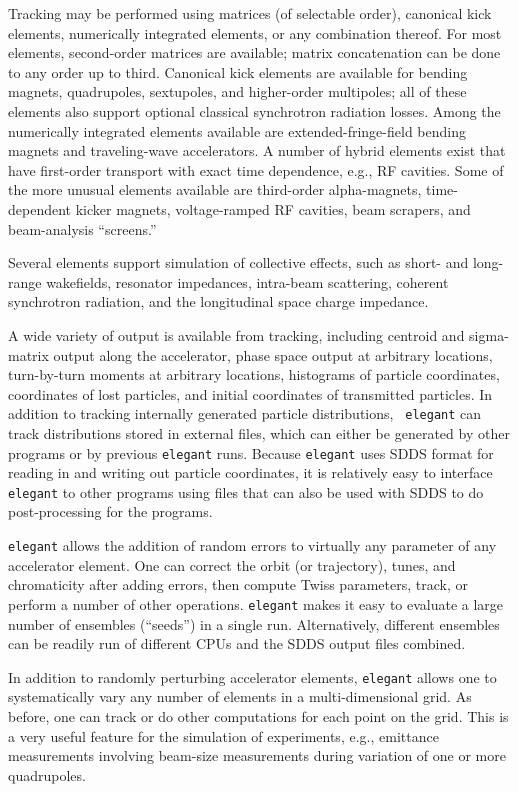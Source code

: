 \documentclass[11pt]{article}
\begin{document}
Tracking may be performed using matrices (of selectable order),
canonical kick elements, numerically integrated elements, or any
combination thereof.  For most elements, second-order matrices are
available; matrix concatenation can be done to any order up to third.
Canonical kick elements are available for bending magnets,
quadrupoles, sextupoles, and higher-order multipoles; all of these
elements also support optional classical synchrotron radiation losses.
Among the numerically integrated elements available are
extended-fringe-field bending magnets and traveling-wave accelerators.
A number of hybrid elements exist that have first-order transport with
exact time dependence, e.g., RF cavities.    Some of the more unusual
elements available are third-order
alpha-magnets\cite{Enge,Borland_thesis}, time-dependent kicker
magnets, voltage-ramped RF cavities, beam scrapers, and beam-analysis
``screens.''

Several elements support simulation of collective effects, such as
short- and long-range wakefields, resonator impedances, intra-beam scattering,
coherent synchrotron radiation, and the longitudinal space charge
impedance. 

A wide variety of output is available from tracking, including
centroid and sigma-matrix output along the accelerator, phase space
output at arbitrary locations, turn-by-turn moments at arbitrary
locations, histograms of particle coordinates, coordinates of lost
particles, and initial coordinates of transmitted particles.  In
addition to tracking internally generated particle distributions, {\tt
elegant} can track distributions stored in external files, which can
either be generated by other programs or by previous {\tt elegant}
runs.  Because {\tt elegant} uses SDDS format for reading in and
writing out particle coordinates, it is relatively easy to interface
{\tt elegant} to other programs using files that can also be used with
SDDS to do post-processing for the programs.

{\tt elegant} allows the addition of random errors to virtually any
parameter of any accelerator element.  One can correct the orbit (or
trajectory), tunes, and chromaticity after adding errors, then compute
Twiss parameters, track, or perform a number of other operations.
{\tt elegant} makes it easy to evaluate a large number of ensembles (``seeds'')
in a single run.  Alternatively, different ensembles can be readily run
of different CPUs and the SDDS output files combined.

In addition to randomly perturbing accelerator elements, {\tt elegant}
allows one to systematically vary any number of elements in a
multi-dimensional grid.  As before, one can track or do other
computations for each point on the grid.  This is a very useful
feature for the simulation of experiments, e.g., emittance
measurements involving beam-size measurements during variation of one
or more quadrupoles\cite{Borland_PC}.
\end{document}
